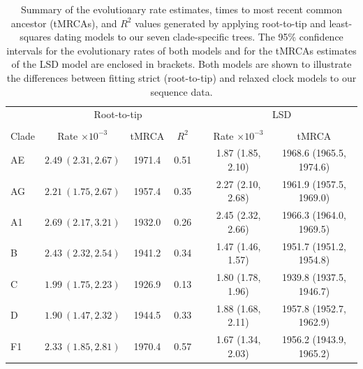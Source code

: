 \documentclass[12pt]{article}
\providecommand{\DIFadd}[1]{{\protect\color{blue}\uwave{#1}}} %
\providecommand{\DIFaddFL}[1]{\DIFadd{#1}} %
\providecommand{\DIFaddbeginFL}{} %
\providecommand{\DIFaddendFL}{} %
\newcommand{\DIFaddincludegraphics}[2][]{{\color{blue}\fbox{\DIFOincludegraphics[#1]{#2}}}} %
\DeclareRobustCommand{\DIFaddbeginFL}{\DIFOaddbeginFL \let\includegraphics\DIFaddincludegraphics} %
\DeclareRobustCommand{\DIFaddendFL}{\DIFOaddendFL \let\includegraphics\DIFOincludegraphics} %
\begin{document}
\begin{table}[htbp]
	\centering
	\begin{tabular}{lcccccc}
  	\hline
     & \multicolumn{3}{c}{Root-to-tip} && \multicolumn{2}{c}{LSD}\\
     \cline{1-4}\cline{6-7}\\
 	 Clade & Rate $\times 10^{-3}$ & tMRCA & $R^2$ & &Rate $\times 10^{-3}$ & tMRCA\\ 
 	 \cline{1-4}\cline{6-7}
	 \DIFaddbeginFL \DIFaddFL{01\_}\DIFaddendFL AE & $2.49~ (2.31, 2.67)$ & 1971.4 & 0.51 && 1.87 (1.85, 2.10) & 1968.6 (1965.5, 1974.6)\\ 
 	 \DIFaddbeginFL \DIFaddFL{02\_}\DIFaddendFL AG & $2.21~ (1.75, 2.67)$ & 1957.4 & 0.35 & &2.27 (2.10, 2.68) & 1961.9 (1957.5, 1969.0)\\ 
	A1 & $2.69~ (2.17, 3.21)$ & 1932.0 & 0.26 && 2.45 (2.32, 2.66) & 1966.3 (1964.0, 1969.5)\\ 
  	B & $2.43~ (2.32, 2.54)$ & 1941.2 & 0.34 & &1.47 (1.46, 1.57) & 1951.7 (1951.2, 1954.8)\\ 
  	C & $1.99~ (1.75, 2.23)$ & 1926.9 & 0.13 & &1.80 (1.78, 1.96) & 1939.8 (1937.5, 1946.7) \\ 
    D & $1.90~ (1.47, 2.32)$ & 1944.5 & 0.33 & &1.88 (1.68, 2.11)& 1957.8 (1952.7, 1962.9)\\ 
  	F1 & $2.33~ (1.85, 2.81)$ & 1970.4 & 0.57 & &1.67 (1.34, 2.03) & 1956.2 (1943.9, 1965.2)\\ 
   	\hline
	\end{tabular}
    \caption{Summary of the evolutionary rate estimates, times to most recent common ancestor (tMRCAs), and $R^2$ values generated by applying root-to-tip and least-squares dating models to our seven clade-specific trees. 
    The 95\% confidence intervals for the evolutionary rates of both models and for the tMRCAs estimates of the LSD model are enclosed in brackets.
    Both models are shown to illustrate the differences between fitting strict (root-to-tip) and relaxed clock models to our sequence data. 
    }
    \label{tab:xint}
\end{table}
\end{document}
